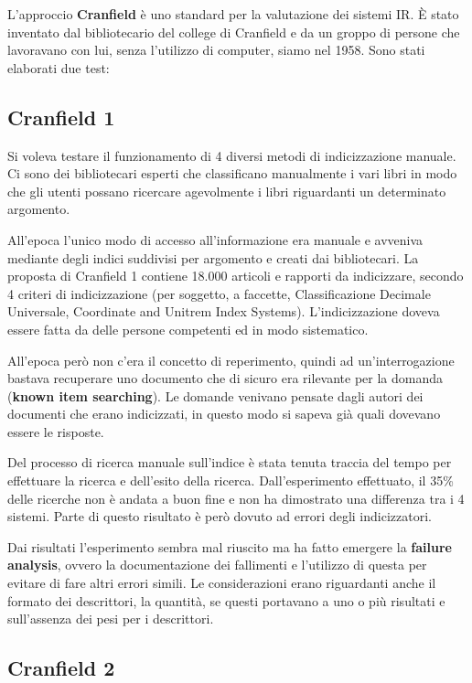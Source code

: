 L'approccio \textbf{Cranfield} è uno standard per la valutazione dei sistemi IR.
\`E stato inventato dal bibliotecario del college di Cranfield e da un groppo di persone che lavoravano con lui, senza l'utilizzo di computer, siamo nel 1958. 
Sono stati elaborati due test:

\subsection{Cranfield 1} 

Si voleva testare il funzionamento di 4 diversi metodi di indicizzazione manuale. Ci sono dei bibliotecari esperti che classificano manualmente i vari libri in modo che gli utenti possano ricercare agevolmente i libri riguardanti un determinato argomento.

All'epoca l'unico modo di accesso all'informazione era manuale e avveniva mediante degli indici suddivisi per argomento e creati dai bibliotecari.
La proposta di Cranfield 1 contiene 18.000 articoli e rapporti da indicizzare, secondo 4 criteri di indicizzazione (per soggetto, a faccette, Classificazione Decimale Universale, Coordinate and Unitrem Index Systems). L'indicizzazione doveva essere fatta da delle persone competenti ed in modo sistematico.
	
All'epoca però non c'era il concetto di reperimento, quindi ad un'interrogazione bastava recuperare uno documento che di sicuro era rilevante per la domanda (\textbf{known item searching}). Le domande venivano pensate dagli autori dei documenti che erano indicizzati, in questo modo si sapeva già quali dovevano essere le risposte.
	
Del processo di ricerca manuale sull'indice è stata tenuta traccia del tempo per effettuare la ricerca e dell'esito della ricerca. Dall'esperimento effettuato, il 35\% delle ricerche non è andata a buon fine e non ha dimostrato una differenza tra i 4 sistemi.
Parte di questo risultato è però dovuto ad errori degli indicizzatori.
	
Dai risultati l'esperimento sembra mal riuscito ma ha fatto emergere la \textbf{failure analysis}, ovvero la documentazione dei fallimenti e l'utilizzo di questa per evitare di fare altri errori simili. Le considerazioni erano riguardanti anche il formato dei descrittori, la quantità, se questi portavano a uno o più risultati e sull'assenza dei pesi per i descrittori.
	
\subsection{Cranfield 2}

